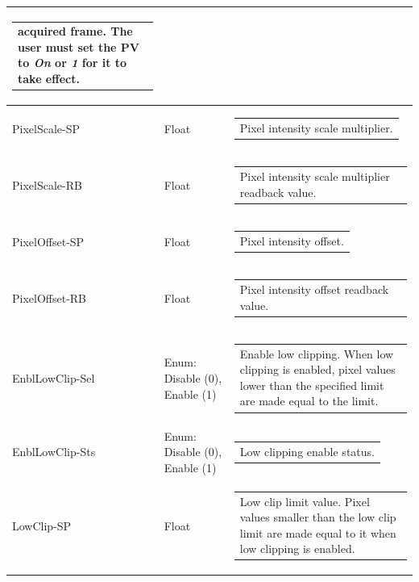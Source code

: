 \documentclass[openany]{article}
\begin{document}
\begin{longtable}{| m{3.0cm} m{4.5cm}  m{7.0cm} |}
\begin{tabular}{@{}m{6cm}@{}}
                acquired frame. The user must set the PV to \emph{On} or \emph{1} for it to take effect.
            \end{tabular} \hypertarget{pv:pixel-scale}{}\\ \hline
        PixelScale-SP & Float & \begin{tabular}{@{}m{6cm}@{}}
                Pixel intensity scale multiplier.
            \end{tabular} \\ \hline
        PixelScale-RB & Float & \begin{tabular}{@{}m{6cm}@{}}
                Pixel intensity scale multiplier readback value.
            \end{tabular} \hypertarget{pv:pixel-offset}{}\\ \hline
        PixelOffset-SP & Float & \begin{tabular}{@{}m{6cm}@{}}
                Pixel intensity offset.
            \end{tabular} \\ \hline
        PixelOffset-RB & Float & \begin{tabular}{@{}m{6cm}@{}}
                Pixel intensity offset readback value.
            \end{tabular} \hypertarget{pv:enbl-low-clip}{}\\ \hline
        EnblLowClip-Sel & Enum: Disable (0), Enable (1) & \begin{tabular}{@{}m{6cm}@{}}
                Enable low clipping. When low clipping is enabled,
                pixel values lower than the specified limit are made equal to the
                limit.
            \end{tabular} \\ \hline
        EnblLowClip-Sts & Enum: Disable (0), Enable (1) & \begin{tabular}{@{}m{6cm}@{}}
                Low clipping enable status.
            \end{tabular} \hypertarget{pv:low-clip}{}\\ \hline
        LowClip-SP & Float & \begin{tabular}{@{}m{6cm}@{}}
                Low clip limit value. Pixel values smaller than the low
                clip limit are made equal to it when low clipping is enabled.
            \end{tabular} \\ \hline

\end{longtable}
\end{document}
